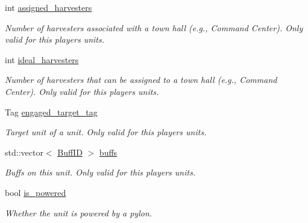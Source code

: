 \begin{DoxyCompactItemize}
\mbox{\label{classsc2_1_1_unit_aca42babe7fa2542782783a825fb99522}} 
int \hyperlink{classsc2_1_1_unit_aca42babe7fa2542782783a825fb99522}{assigned\+\_\+harvesters}
\begin{DoxyCompactList}\small\item\em Number of harvesters associated with a town hall (e.\+g., Command Center). Only valid for this player\textquotesingle{}s units. \end{DoxyCompactList}\item 
\mbox{\label{classsc2_1_1_unit_a59c9e7c9c14f50f11d33b58716f664fe}} 
int \hyperlink{classsc2_1_1_unit_a59c9e7c9c14f50f11d33b58716f664fe}{ideal\+\_\+harvesters}
\begin{DoxyCompactList}\small\item\em Number of harvesters that can be assigned to a town hall (e.\+g., Command Center). Only valid for this player\textquotesingle{}s units. \end{DoxyCompactList}\item 
\mbox{\label{classsc2_1_1_unit_a0d1cc770a037ed2458bf944a787dcca5}} 
Tag \hyperlink{classsc2_1_1_unit_a0d1cc770a037ed2458bf944a787dcca5}{engaged\+\_\+target\+\_\+tag}
\begin{DoxyCompactList}\small\item\em Target unit of a unit. Only valid for this player\textquotesingle{}s units. \end{DoxyCompactList}\item 
\mbox{\label{classsc2_1_1_unit_a34f17705c61114ad78c192ed7b06a9af}} 
std\+::vector$<$ \hyperlink{classsc2_1_1_s_c2_type}{Buff\+ID} $>$ \hyperlink{classsc2_1_1_unit_a34f17705c61114ad78c192ed7b06a9af}{buffs}
\begin{DoxyCompactList}\small\item\em Buffs on this unit. Only valid for this player\textquotesingle{}s units. \end{DoxyCompactList}\item 
\mbox{\label{classsc2_1_1_unit_a13e408736f731902adb60d2725507dc9}} 
bool \hyperlink{classsc2_1_1_unit_a13e408736f731902adb60d2725507dc9}{is\+\_\+powered}
\begin{DoxyCompactList}\small\item\em Whether the unit is powered by a pylon. \end{DoxyCompactList}\item 

\end{DoxyCompactItemize}
